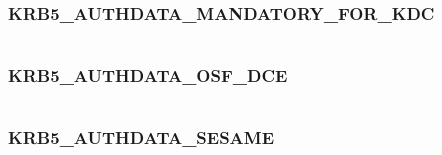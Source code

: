 \documentclass[letterpaper,10pt,english]{sphinxmanual}
\begin{document}
\subsubsection{KRB5\_AUTHDATA\_MANDATORY\_FOR\_KDC}
\label{appdev/refs/macros/KRB5_AUTHDATA_MANDATORY_FOR_KDC:krb5-authdata-mandatory-for-kdc}\label{appdev/refs/macros/KRB5_AUTHDATA_MANDATORY_FOR_KDC::doc}\label{appdev/refs/macros/KRB5_AUTHDATA_MANDATORY_FOR_KDC:krb5-authdata-mandatory-for-kdc-data}

\begin{fulllineitems}
\label{appdev/refs/macros/KRB5_AUTHDATA_MANDATORY_FOR_KDC:KRB5_AUTHDATA_MANDATORY_FOR_KDC}
\end{fulllineitems}


\begin{tabulary}{\linewidth}{|L|L|}
\hline

 & 
\\
\hline\end{tabulary}



\subsubsection{KRB5\_AUTHDATA\_OSF\_DCE}
\label{appdev/refs/macros/KRB5_AUTHDATA_OSF_DCE:krb5-authdata-osf-dce-data}\label{appdev/refs/macros/KRB5_AUTHDATA_OSF_DCE::doc}\label{appdev/refs/macros/KRB5_AUTHDATA_OSF_DCE:krb5-authdata-osf-dce}

\begin{fulllineitems}
\label{appdev/refs/macros/KRB5_AUTHDATA_OSF_DCE:KRB5_AUTHDATA_OSF_DCE}
\end{fulllineitems}


\begin{tabulary}{\linewidth}{|L|L|}
\hline

 & 
\\
\hline\end{tabulary}



\subsubsection{KRB5\_AUTHDATA\_SESAME}
\label{appdev/refs/macros/KRB5_AUTHDATA_SESAME:krb5-authdata-sesame}\label{appdev/refs/macros/KRB5_AUTHDATA_SESAME::doc}\label{appdev/refs/macros/KRB5_AUTHDATA_SESAME:krb5-authdata-sesame-data}
\end{document}
